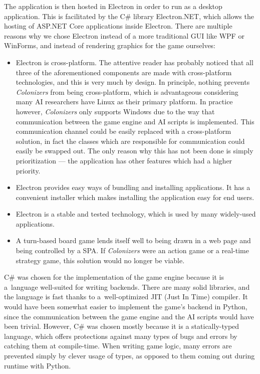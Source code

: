 The application is then hosted in Electron in order to run as a desktop application.
This is facilitated by the C\# library Electron.NET, which allows the hosting
of ASP.NET Core applications inside Electron. There are multiple reasons why
we chose Electron instead of a more traditional GUI like WPF or WinForms,
and instead of rendering graphics for the game ourselves:
\begin{itemize}
    \item Electron is cross-platform. The attentive reader has probably noticed that
        all three of the aforementioned components are made with cross-platform
        technologies, and this is very much by design. In principle, nothing
        prevents \emph{Colonizers} from being cross-platform, which is advantageous
        considering many AI researchers have Linux as their primary platform.
        In practice however, \emph{Colonizers} only supports Windows due to
        the way that communication between the game engine and AI scripts
        is implemented. This communication channel could be easily replaced
        with a cross-platform solution, in fact the classes which are responsible
        for communication could easily be swapped out. The only reason why
        this has not been done is simply prioritization --- the application has
        other features which had a higher priority.
    \item Electron provides easy ways of bundling and installing applications.
        It has a convenient installer which makes installing the application
        easy for end users.
    \item Electron is a stable and tested technology, which is used by
        many widely-used applications.
    \item A turn-based board game lends itself well to being drawn in a web page
        and being controlled by a SPA. If \emph{Colonizers} were an action game or
        a real-time strategy game, this solution would no longer be viable.
\end{itemize}

C\# was chosen for the implementation of the game engine because it is a~language
well-suited for writing backends. There are many solid libraries, and the language
is fast thanks to a~well-optimized JIT (Just In Time) compiler. It would have
been somewhat easier to implement the game's backend in Python, since the communication
between the game engine and the AI scripts would have been trivial. However, C\# was chosen
mostly because it is a statically-typed language, which offers protections against many
types of bugs and errors by catching them at compile-time. When writing game logic,
many errors are prevented simply by clever usage of types, as opposed to them
coming out during runtime with Python.

